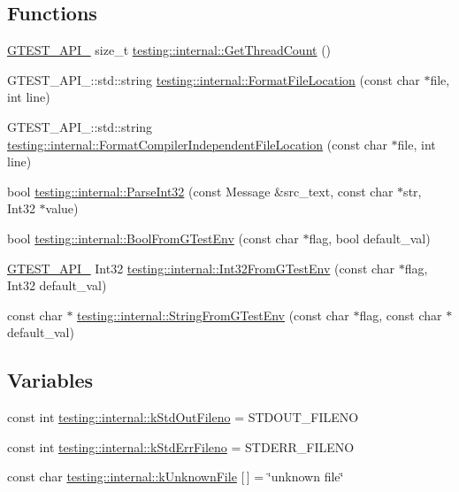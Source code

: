 \subsection*{Functions}
\begin{DoxyCompactItemize}
\item 
\hyperlink{gtest-port_8h_aa73be6f0ba4a7456180a94904ce17790}{G\+T\+E\+S\+T\+\_\+\+A\+P\+I\+\_\+} size\+\_\+t \hyperlink{namespacetesting_1_1internal_a3b9b3649cd04558bf46c75de52a7ef34}{testing\+::internal\+::\+Get\+Thread\+Count} ()
\item 
G\+T\+E\+S\+T\+\_\+\+A\+P\+I\+\_\+\+::std\+::string \hyperlink{namespacetesting_1_1internal_a31b7c3abed4a7c395f42c61e993989f4}{testing\+::internal\+::\+Format\+File\+Location} (const char $\ast$file, int line)
\item 
G\+T\+E\+S\+T\+\_\+\+A\+P\+I\+\_\+\+::std\+::string \hyperlink{namespacetesting_1_1internal_a1ee4cde97868c53e442d3182496a9f3c}{testing\+::internal\+::\+Format\+Compiler\+Independent\+File\+Location} (const char $\ast$file, int line)
\item 
bool \hyperlink{namespacetesting_1_1internal_ac06fc81336a3d80755f4020d34321766}{testing\+::internal\+::\+Parse\+Int32} (const Message \&src\+\_\+text, const char $\ast$str, Int32 $\ast$value)
\item 
bool \hyperlink{namespacetesting_1_1internal_a67132cdce23fb71b6c38ee34ef81eb4c}{testing\+::internal\+::\+Bool\+From\+G\+Test\+Env} (const char $\ast$flag, bool default\+\_\+val)
\item 
\hyperlink{gtest-port_8h_aa73be6f0ba4a7456180a94904ce17790}{G\+T\+E\+S\+T\+\_\+\+A\+P\+I\+\_\+} Int32 \hyperlink{namespacetesting_1_1internal_a0f7e728793f9e6cb0aa2b69eaa468bf3}{testing\+::internal\+::\+Int32\+From\+G\+Test\+Env} (const char $\ast$flag, Int32 default\+\_\+val)
\item 
const char $\ast$ \hyperlink{namespacetesting_1_1internal_a7ed785df46a339403b0f749d3a879201}{testing\+::internal\+::\+String\+From\+G\+Test\+Env} (const char $\ast$flag, const char $\ast$default\+\_\+val)
\end{DoxyCompactItemize}
\subsection*{Variables}
\begin{DoxyCompactItemize}
\item 
const int \hyperlink{namespacetesting_1_1internal_a24f0a3d50cac54a9132f4828ec9b96d9}{testing\+::internal\+::k\+Std\+Out\+Fileno} = S\+T\+D\+O\+U\+T\+\_\+\+F\+I\+L\+E\+N\+O
\item 
const int \hyperlink{namespacetesting_1_1internal_a747eccfdbdee3ff8af3bedc476a57c85}{testing\+::internal\+::k\+Std\+Err\+Fileno} = S\+T\+D\+E\+R\+R\+\_\+\+F\+I\+L\+E\+N\+O
\item 
const char \hyperlink{namespacetesting_1_1internal_abae7a5775c901f2fd12b058b00d09840}{testing\+::internal\+::k\+Unknown\+File} \mbox{[}$\,$\mbox{]} = \char`\"{}unknown file\char`\"{}
\end{DoxyCompactItemize}


